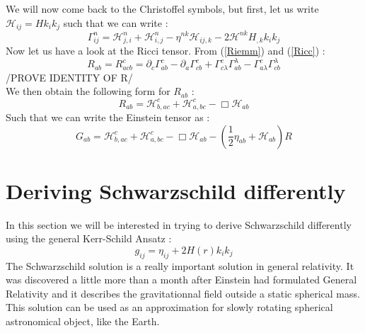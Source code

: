 \documentclass[a4paper,12pt]{article}
\theoremstyle{definition}
\begin{document}
We will now come back to the Christoffel symbols, but first, let us write $\mathcal{H}_{ij}=Hk_ik_j$ such that we can write :
\begin{equation}
	\Gamma^n_{ij}=\mathcal{H}^n_{j,i}+\mathcal{H}^n_{i,j}-\eta^{nk}\mathcal{H}_{ij,k}-2\mathcal{H}^{nk}H_{,k}k_ik_j
\end{equation}
Now let us have a look at the Ricci tensor. From (\ref{Riemm}) and (\ref{Ricc}) :
\begin{equation}
	R_{ab}=R^c_{acb}=\partial_c\Gamma^c_{ab}-\partial_a\Gamma^c_{cb}+\Gamma^c_{c\lambda}\Gamma^\lambda_{ab}-\Gamma^c_{a\lambda}\Gamma^\lambda_{cb}
\end{equation}
/PROVE IDENTITY OF R/\\
We then obtain the following form for $R_{ab}$ :
\begin{equation}
	R_{ab}=\mathcal{H}^c_{b,ac}+\mathcal{H}^c_{a,bc}-\Box\mathcal{H}_{ab}
\end{equation}
Such that we can write the Einstein tensor as :
\begin{equation}
	G_{ab}=\mathcal{H}^c_{b,ac}+\mathcal{H}^c_{a,bc}-\Box\mathcal{H}_{ab}-(\frac{1}{2}\eta_{ab}+\mathcal{H}_{ab})R
\end{equation}

\section{Deriving Schwarzschild differently}
In this section we will be interested in trying to derive Schwarzschild differently using the general Kerr-Schild Ansatz :
\begin{equation}
	g_{ij}=\eta_{ij}+2H(r)k_ik_j
\end{equation}
The Schwarzschild solution is a really important solution in general relativity.
It was discovered a little more than a month after Einstein had formulated General Relativity and it describes the gravitationnal field outside a static spherical mass.
This solution can be used as an approximation for slowly rotating spherical astronomical object, like the Earth.
\end{document}
